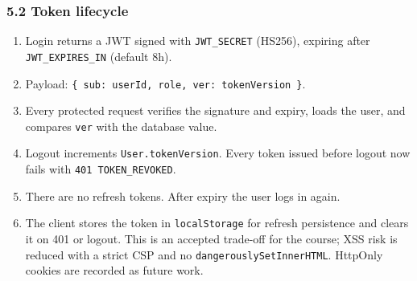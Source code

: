 \documentclass[12pt,a4paper]{article}
\begin{document}
\subsubsection*{5.2 Token lifecycle}
\begin{enumerate}[leftmargin=*]
\item Login returns a JWT signed with \texttt{JWT\_SECRET} (HS256), expiring after \texttt{JWT\_EXPIRES\_IN} (default 8h).
\item Payload: \texttt{\{ sub: userId, role, ver: tokenVersion \}}.
\item Every protected request verifies the signature and expiry, loads the user, and compares \texttt{ver} with the database value.
\item Logout increments \texttt{User.tokenVersion}. Every token issued before logout now fails with \texttt{401 TOKEN\_REVOKED}.
\item There are no refresh tokens. After expiry the user logs in again.
\item The client stores the token in \texttt{localStorage} for refresh persistence and clears it on 401 or logout. This is an accepted trade-off for the course; XSS risk is reduced with a strict CSP and no \texttt{dangerouslySetInnerHTML}. HttpOnly cookies are recorded as future work.
\end{enumerate}

\end{document}

